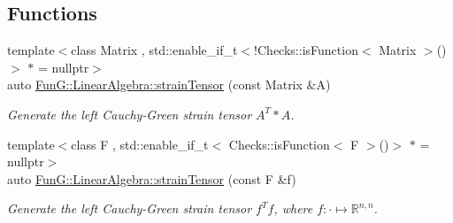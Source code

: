 \subsection*{Functions}
\begin{DoxyCompactItemize}
\item 
{\footnotesize template$<$class Matrix , std\+::enable\+\_\+if\+\_\+t$<$!\+Checks\+::is\+Function$<$ Matrix $>$()$>$ $\ast$  = nullptr$>$ }\\auto \hyperlink{namespaceFunG_1_1LinearAlgebra_a0e10030a723fad88f5f4f0b6612c393a}{Fun\+G\+::\+Linear\+Algebra\+::strain\+Tensor} (const Matrix \&A)
\begin{DoxyCompactList}\small\item\em Generate the left Cauchy-\/\+Green strain tensor $A^T*A$. \end{DoxyCompactList}\item 
{\footnotesize template$<$class F , std\+::enable\+\_\+if\+\_\+t$<$ Checks\+::is\+Function$<$ F $>$()$>$ $\ast$  = nullptr$>$ }\\auto \hyperlink{namespaceFunG_1_1LinearAlgebra_ab4371788da401ca62a3a29a13cf8d4ce}{Fun\+G\+::\+Linear\+Algebra\+::strain\+Tensor} (const F \&f)
\begin{DoxyCompactList}\small\item\em Generate the left Cauchy-\/\+Green strain tensor $f^Tf$, where $f:\cdot\mapsto\mathbb{R}^{n,n} $. \end{DoxyCompactList}\end{DoxyCompactItemize}
